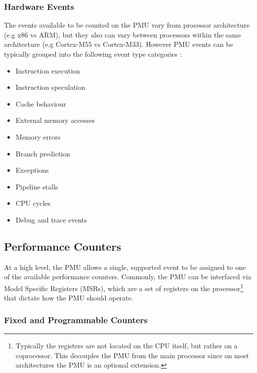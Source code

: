 {\subsubsection{Hardware Events}

The events available to be counted on the PMU vary from processor architecture (e.g x86 vs ARM), but they also can vary between processors within the same architecture (e.g Cortex-M55 vs Cortex-M33). However PMU events can be typically grouped into the following event type categories \cite{DocsArmv8PMU}:

\begin{multicols}{2}
\ssp
\begin{itemize}
    \item Instruction execution
    \item Instruction speculation
    \item Cache behaviour 
    \item External memory accesses
    \item Memory errors
\end{itemize}
\columnbreak
\begin{itemize}
    \item Branch prediction
    \item Exceptions
    \item Pipeline stalls
    \item CPU cycles
    \item Debug and trace events
\end{itemize}
\dsp
\end{multicols}

\subsection{Performance Counters}

At a high level, the PMU allows a single, supported event to be assigned to one of the available performance counters. Commonly, the PMU can be interfaced via Model Specific Registers (MSRs), which are a set of registers on the processor\footnote{Typically the registers are not located on the CPU itself, but rather on a coprocessor. This decouples the PMU from the main processor since on most architectures the PMU is an optional extension.} that dictate how the PMU should operate.

\subsubsection{Fixed and Programmable Counters}

}
